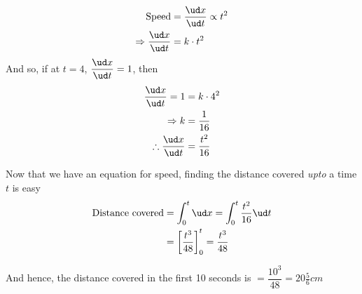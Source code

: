 \begin{solution}[\halfpage]
  \begin{align}
     \text{Speed} &= \dfrac{\ud x}{\ud t} \propto t^2 \\
     \Rightarrow \dfrac{\ud x}{\ud t} &= k\cdot t^2
  \end{align}
  And so, if at $t=4$, $\dfrac{\ud x}{\ud t} = 1$, then 
  \begin{align}
     \dfrac{\ud x}{\ud t} = 1 &= k\cdot 4^2 \\
     \Rightarrow k &= \frac{1}{16} \\
     \therefore \dfrac{\ud x}{\ud t} &= \dfrac{t^2}{16}
  \end{align}
  
  Now that we have an equation for speed, finding the distance covered \textit{upto}
  a time $t$ is easy
  \begin{align}
     \text{Distance covered} &= \int_{0}^{t} \ud x = \int_0^{t}\dfrac{t^2}{16}\ud t \\
     &= \left[ \dfrac{t^3}{48}\right]_0^{t} = \dfrac{t^3}{48}
  \end{align}
  
  And hence, the distance covered in the first 10 seconds is $ = \dfrac{10^3}{48} = 20\frac{5}{6}cm$
\end{solution}
